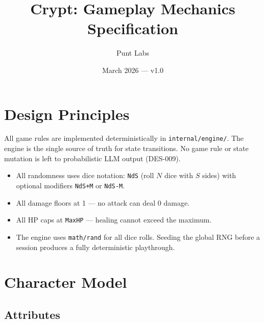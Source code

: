 \documentclass[a4paper,10pt]{article}
\newcommand{\dice}[1]{\texttt{#1}}
\newcommand{\field}[1]{\texttt{#1}}
\begin{document}
\title{Crypt: Gameplay Mechanics Specification}
\author{Punt Labs}
\date{March 2026 --- v1.0}
\maketitle
\tableofcontents
\newpage

\section{Design Principles}

All game rules are implemented deterministically in \texttt{internal/engine/}.
The engine is the single source of truth for state transitions. No game rule
or state mutation is left to probabilistic LLM output (DES-009).

\begin{itemize}[nosep]
  \item All randomness uses dice notation: \dice{NdS} (roll $N$ dice with
        $S$ sides) with optional modifiers \dice{NdS+M} or \dice{NdS-M}.
  \item All damage floors at 1 --- no attack can deal 0 damage.
  \item All HP caps at \field{MaxHP} --- healing cannot exceed the maximum.
  \item The engine uses \texttt{math/rand} for all dice rolls. Seeding the
        global RNG before a session produces a fully deterministic playthrough.
\end{itemize}

\section{Character Model}

\subsection{Attributes}
\end{document}

